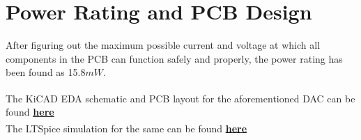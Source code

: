 \documentclass[oneside]{book}
\begin{document}
\chapter{Power Rating and PCB Design}

After figuring out the maximum possible current and voltage at which all components in the PCB can function safely and properly, the power rating has been found as 15.8$mW$.
\\ \bigskip

The KiCAD EDA\textsuperscript{\textregistered} schematic and PCB layout for the aforementioned DAC can be found \href{https://github.com/HarryNyquist/Elektronica/tree/main/PCB/ADC_DAC_Converter/DAC_Converter%20-%20KiCAD}{\underline{\textbf{here}}}
\\ \bigskip
The LTSpice\textsuperscript{\textregistered} simulation for the same can be found \href{https://github.com/HarryNyquist/Elektronica/tree/main/PCB/ADC_DAC_Converter/DAC_Converter%20-%20LTSpice%20Simulations}{\underline{\textbf{here}}}
\end{document}
